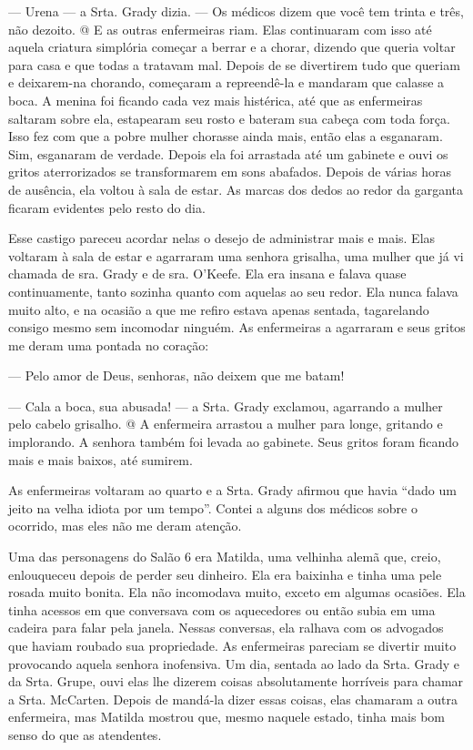 --- Urena --- a Srta. Grady dizia. --- Os médicos dizem que você tem
trinta e três, não dezoito. @ E as outras enfermeiras riam. Elas
continuaram com isso até aquela criatura simplória começar a berrar e a
chorar, dizendo que queria voltar para casa e que todas a tratavam mal.
Depois de se divertirem tudo que queriam e deixarem-na chorando,
começaram a repreendê-la e mandaram que calasse a boca. A menina foi
ficando cada vez mais histérica, até que as enfermeiras saltaram sobre
ela, estapearam seu rosto e bateram sua cabeça com toda força. Isso fez
com que a pobre mulher chorasse ainda mais, então elas a esganaram. Sim,
esganaram de verdade. Depois ela foi arrastada até um gabinete e ouvi os
gritos aterrorizados se transformarem em sons abafados. Depois de várias
horas de ausência, ela voltou à sala de estar. As marcas dos dedos ao
redor da garganta ficaram evidentes pelo resto do dia.

Esse castigo pareceu acordar nelas o desejo de administrar mais e mais.
Elas voltaram à sala de estar e agarraram uma senhora grisalha, uma
mulher que já vi chamada de sra. Grady e de sra. O'Keefe. Ela era insana
e falava quase continuamente, tanto sozinha quanto com aquelas ao seu
redor. Ela nunca falava muito alto, e na ocasião a que me refiro estava
apenas sentada, tagarelando consigo mesmo sem incomodar ninguém. As
enfermeiras a agarraram e seus gritos me deram uma pontada no coração:

--- Pelo amor de Deus, senhoras, não deixem que me batam!

--- Cala a boca, sua abusada! --- a Srta. Grady exclamou, agarrando a
mulher pelo cabelo grisalho. @ A enfermeira arrastou a mulher para
longe, gritando e implorando. A senhora também foi levada ao gabinete.
Seus gritos foram ficando mais e mais baixos, até sumirem.

As enfermeiras voltaram ao quarto e a Srta. Grady afirmou que havia
``dado um jeito na velha idiota por um tempo''. Contei a alguns dos
médicos sobre o ocorrido, mas eles não me deram atenção.

Uma das personagens do Salão 6 era Matilda, uma velhinha alemã que,
creio, enlouqueceu depois de perder seu dinheiro. Ela era baixinha e
tinha uma pele rosada muito bonita. Ela não incomodava muito, exceto em
algumas ocasiões. Ela tinha acessos em que conversava com os aquecedores
ou então subia em uma cadeira para falar pela janela. Nessas conversas,
ela ralhava com os advogados que haviam roubado sua propriedade. As
enfermeiras pareciam se divertir muito provocando aquela senhora
inofensiva. Um dia, sentada ao lado da Srta. Grady e da Srta. Grupe,
ouvi elas lhe dizerem coisas absolutamente horríveis para chamar a Srta.
McCarten. Depois de mandá-la dizer essas coisas, elas chamaram a outra
enfermeira, mas Matilda mostrou que, mesmo naquele estado, tinha mais
bom senso do que as atendentes.

